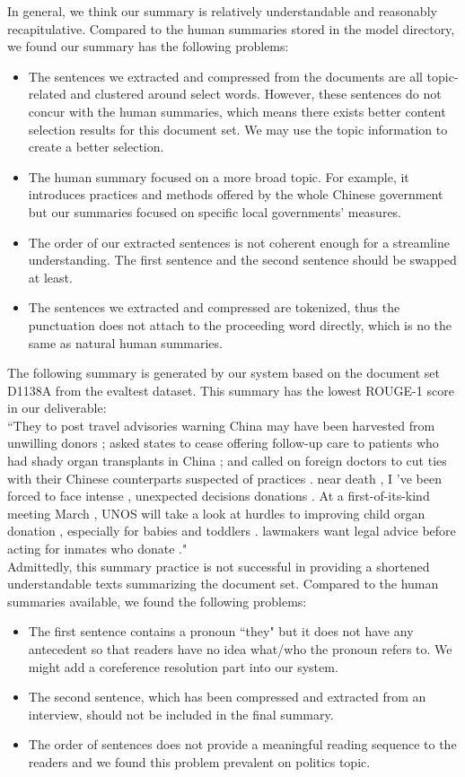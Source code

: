 \documentclass[11pt]{article}
\begin{document}
In general, we think our summary is relatively understandable and reasonably recapitulative. Compared to the human summaries stored in the model directory, we found our summary has the following problems:

\begin{itemize}  
\item The sentences we extracted and compressed from the documents are all topic-related and clustered around select words. However, these sentences do not concur with the human summaries, which means there exists better content selection results for this document set. We may use the topic information to create a better selection.
\item The human summary focused on a more broad topic. For example, it introduces practices and methods offered by the whole Chinese government but our summaries focused on specific local governments' measures.
\item The order of our extracted sentences is not coherent enough for a streamline understanding. The first sentence and the second sentence should be swapped at least.
\item The sentences we extracted and compressed are tokenized, thus the punctuation does not attach to the proceeding word directly, which is no the same as natural human summaries.
\end{itemize}

The following summary is generated by our system based on the document set D1138A from the evaltest dataset. This summary has the lowest ROUGE-1 score in our deliverable:\\

``They to post travel advisories warning China may have been harvested from unwilling donors ; asked states to cease offering follow-up care to patients who had shady organ transplants in China ; and called on foreign doctors to cut ties with their Chinese counterparts suspected of practices .
near death , I 've been forced to face intense , unexpected decisions donations .
At a first-of-its-kind meeting March , UNOS will take a look at hurdles to improving child organ donation , especially for babies and toddlers .
lawmakers want legal advice before acting for inmates who donate ."\\

Admittedly, this summary practice is not successful in providing a shortened understandable texts summarizing the document set. Compared to the human summaries available, we found the following problems:
\begin{itemize}
\item The first sentence contains a pronoun ``they" but it does not have any antecedent so that readers have no idea what/who the pronoun refers to. We might add a coreference resolution part into our system.
\item The second sentence, which has been compressed and extracted from an interview, should not be included in the final summary.
\item The order of sentences does not provide a meaningful reading sequence to the readers and we found this problem prevalent on politics topic.
\end{itemize}
\end{document}
